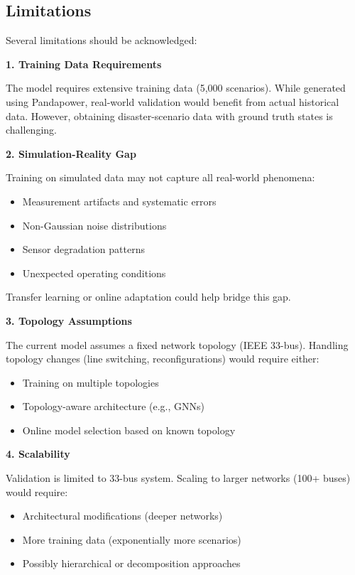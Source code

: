 \documentclass[12pt,a4paper]{report}
\begin{document}
\subsection{Limitations}

Several limitations should be acknowledged:

\textbf{1. Training Data Requirements}

The model requires extensive training data (5,000 scenarios). While generated using Pandapower, real-world validation would benefit from actual historical data. However, obtaining disaster-scenario data with ground truth states is challenging.

\textbf{2. Simulation-Reality Gap}

Training on simulated data may not capture all real-world phenomena:
\begin{itemize}
    \item Measurement artifacts and systematic errors
    \item Non-Gaussian noise distributions
    \item Sensor degradation patterns
    \item Unexpected operating conditions
\end{itemize}

Transfer learning or online adaptation could help bridge this gap.

\textbf{3. Topology Assumptions}

The current model assumes a fixed network topology (IEEE 33-bus). Handling topology changes (line switching, reconfigurations) would require either:
\begin{itemize}
    \item Training on multiple topologies
    \item Topology-aware architecture (e.g., GNNs)
    \item Online model selection based on known topology
\end{itemize}

\textbf{4. Scalability}

Validation is limited to 33-bus system. Scaling to larger networks (100+ buses) would require:
\begin{itemize}
    \item Architectural modifications (deeper networks)
    \item More training data (exponentially more scenarios)
    \item Possibly hierarchical or decomposition approaches
\end{itemize}
\end{document}
